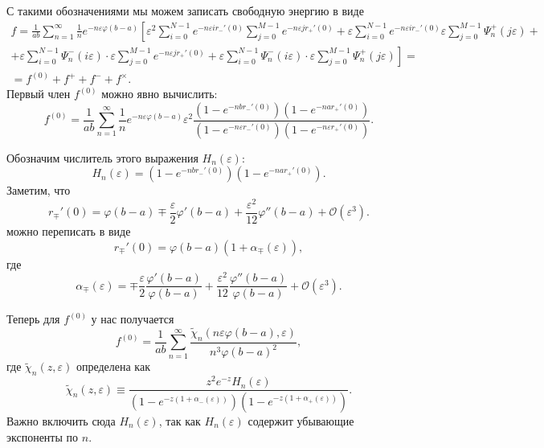 \documentclass{article}
\begin{document}
С такими обозначениями мы можем записать свободную энергию в виде
\begin{multline}
  \label{eq:55}
  f=\frac{1}{ab}\sum_{n=1}^{\infty}\frac{1}{n}e^{-n\varepsilon\varphi(b-a)}\left[\varepsilon^{2}\sum_{i=0}^{N-1}e^{-n\varepsilon
    i r_{-}'(0)}\sum_{j=0}^{M-1}e^{-n\varepsilon j
    r_{+}'(0)}+\varepsilon\sum_{i=0}^{N-1}e^{-n\varepsilon i
    r_{-}'(0)}\varepsilon\sum_{j=0}^{M-1}\Psi^{+}_{n}(j\varepsilon)+\right.\\
\left. +\varepsilon\sum_{i=0}^{N-1}\Psi^{-}_{n}(i\varepsilon) \cdot\varepsilon\sum_{j=0}^{M-1}e^{-n\varepsilon
  j r_{+}'(0)}+\varepsilon\sum_{i=0}^{N-1}\Psi^{-}_{n}(i\varepsilon)
\cdot\varepsilon\sum_{j=0}^{M-1}\Psi^{+}_{n}(j\varepsilon)\right]=\\
=f^{(0)}+f^{+}+f^{-}+f^{\times}.
\end{multline}
Первый член $f^{(0)}$ можно явно вычислить:
\begin{equation}
  \label{eq:56}
  f^{(0)}=\frac{1}{ab}\sum_{n=1}^{\infty}\frac{1}{n} e^{-n\varepsilon
    \varphi(b-a)}\varepsilon^{2}\frac{\left(1-e^{-n b r_{-}'(0)}\right)\left(1-e^{-n a
        r_{+}'(0)}\right)}{\left(1-e^{-n\varepsilon r_{-}'(0)}\right)\left(1-e^{-n\varepsilon r_{+}'(0)}\right)}.
\end{equation}

Обозначим числитель этого выражения $H_{n}(\varepsilon)$:
\begin{equation}
  \label{eq:57}
  H_{n}(\varepsilon)=\left(1-e^{-n b r_{-}'(0)}\right)\left(1-e^{-n a r_{+}'(0)}\right).
\end{equation}
Заметим, что
\begin{equation}
  \label{eq:58}
  r_{\mp}'(0)=\varphi(b-a)\mp \frac{\varepsilon}{2} \varphi'(b-a)+\frac{\varepsilon^{2}}{12} \varphi''(b-a)+\mathcal{O}(\varepsilon^{3}).
\end{equation}
можно переписать в виде
\begin{equation}
  \label{eq:59}
  r_{\mp}'(0)=\varphi(b-a)\left(1+\alpha_{\mp}(\varepsilon)\right), 
\end{equation}
где
\begin{equation}
  \label{eq:60}
  \alpha_{\mp}(\varepsilon)=\mp
  \frac{\varepsilon}{2}\frac{\varphi'(b-a)}{\varphi(b-a)}+\frac{\varepsilon^{2}}{12} \frac{\varphi''(b-a)}{\varphi(b-a)}+\mathcal{O}(\varepsilon^{3}).
\end{equation}

Теперь для $f^{(0)}$ у нас получается
\begin{equation}
  \label{eq:61}
  f^{(0)}=\frac{1}{ab}\sum_{n=1}^{\infty} \frac{\tilde{\chi}_{n}\left(n\varepsilon
      \varphi(b-a),\varepsilon\right) }{n^{3}\varphi(b-a)^{2}},
\end{equation}
где $\tilde{\chi}_{n}(z,\varepsilon)$ определена как
\begin{equation}
  \label{eq:62}
  \tilde{\chi}_{n}(z,\varepsilon)\equiv \frac{z^{2} e^{-z}
    H_{n}(\varepsilon)}{\left(1-e^{-z\left(1+\alpha_{-}(\varepsilon)\right)}\right)
    \left(1-e^{-z\left(1+\alpha_{+}(\varepsilon)\right)}\right)}.
\end{equation}
Важно включить сюда $H_{n}(\varepsilon)$, так как $H_{n}(\varepsilon)$ содержит убывающие экспоненты
по $n$.
\end{document}
